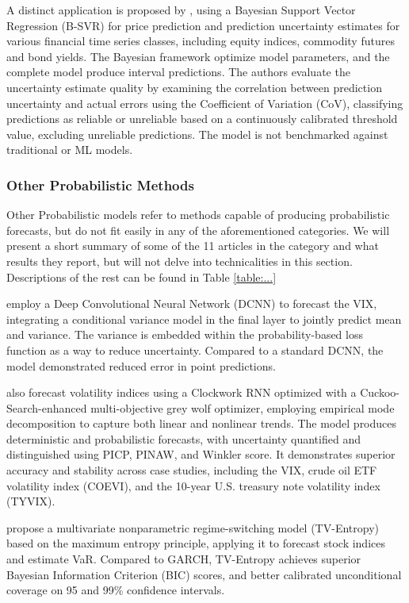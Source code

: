 A distinct application is proposed by \textcite{Law2017Practical}, using a Bayesian Support Vector Regression (B-SVR) for price prediction and prediction uncertainty estimates for various financial time series classes, including equity indices, commodity futures and bond yields. The Bayesian framework optimize model parameters, and the complete model produce interval predictions. The authors evaluate the uncertainty estimate quality by examining the correlation between prediction uncertainty and actual errors using the Coefficient of Variation (CoV), classifying predictions as reliable or unreliable based on a continuously calibrated threshold value, excluding unreliable predictions. The model is not benchmarked against traditional or ML models. 


\subsubsection{Other Probabilistic Methods}
Other Probabilistic models refer to methods capable of producing probabilistic forecasts, but do not fit easily in any of the aforementioned categories. We will present a short summary of some of the 11 articles in the category and what results they report, but will not delve into technicalities in this section. Descriptions of the rest can be found in Table \ref{table:...} 

\textcite{Daniali2021} employ a Deep Convolutional Neural Network (DCNN) to forecast the VIX, integrating a conditional variance model in the final layer to jointly predict mean and variance. The variance is embedded within the probability-based loss function as a way to reduce uncertainty. Compared to a standard DCNN, the model demonstrated reduced error in point predictions. 

\textcite{Tian2023} also forecast volatility indices using a Clockwork RNN optimized with a Cuckoo-Search-enhanced multi-objective grey wolf optimizer, employing empirical mode decomposition to capture both linear and nonlinear trends. The model produces deterministic and probabilistic forecasts, with uncertainty quantified and distinguished using PICP, PINAW, and Winkler score. It demonstrates superior accuracy and stability across case studies, including the VIX, crude oil ETF volatility index (COEVI), and the 10-year U.S. treasury note volatility index (TYVIX).

\textcite{Horenko2020} propose a multivariate nonparametric regime-switching model (TV-Entropy) based on the maximum entropy principle, applying it to forecast stock indices and estimate VaR. Compared to GARCH, TV-Entropy achieves superior Bayesian Information Criterion (BIC) scores, and better calibrated unconditional coverage on 95 and 99\% confidence intervals. 

